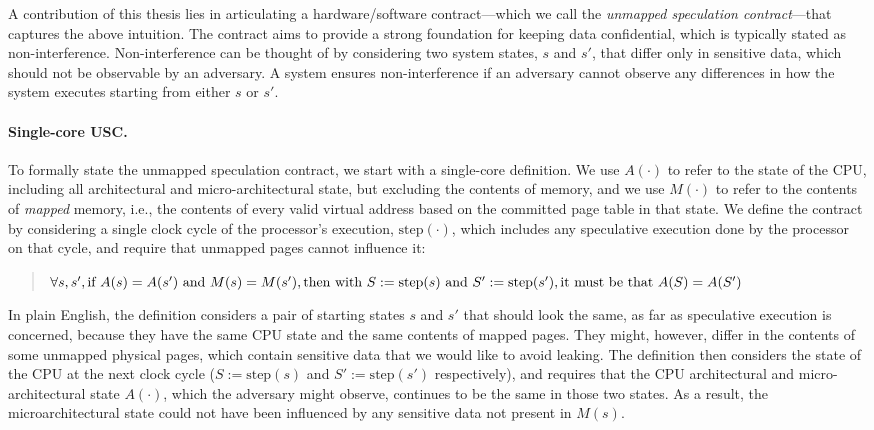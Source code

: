 
A contribution of this thesis lies in articulating a hardware/software
contract---which we call the \emph{unmapped speculation contract}---that
captures the above intuition.  The contract aims to provide a strong
foundation for keeping data confidential, which is typically stated as
non-interference.  Non-interference can be thought of by considering
two system states, $s$ and $s'$, that differ only in sensitive data,
which should not be observable by an adversary.  A system ensures
non-interference if an adversary cannot observe any differences in how
the system executes starting from either $s$ or $s'$.

\paragraph{Single-core USC.} To formally state the unmapped speculation contract, we start with a
single-core definition.  We use $A(\cdot)$ to refer to the state of
the CPU, including all architectural and micro-architectural state,
but excluding the contents of memory, and we use $M(\cdot)$ to refer
to the contents of \emph{mapped} memory, i.e., the contents of every
valid virtual address based on the committed page table in that state.
We define the contract by considering a single clock cycle of the
processor's execution, $\textrm{step}(\cdot)$, which includes any
speculative execution done by the processor on that cycle, and require
that unmapped pages cannot influence it:

\begin{small}
\begin{quote}
$\forall s, s', \\
  \textrm{if~} A(s) = A(s')
  \textrm{~and~} M(s) = M(s'), \\
  \textrm{then~with~} S := \textrm{step}(s)
  \textrm{~and~} S' := \textrm{step}(s'), \\
  \textrm{it~must~be~that~} A(S) = A(S')$
\end{quote}
\end{small}

In plain English, the definition considers a pair of starting states $s$
and $s'$ that should look the same, as far as speculative execution is
concerned, because they have the same CPU state and the same contents
of mapped pages.  They might, however, differ in the contents of some
unmapped physical pages, which contain sensitive data that we would
like to avoid leaking.  The definition then considers the state of
the CPU at the next clock cycle ($S := \textrm{step}(s)$ and $S' :=
\textrm{step}(s')$ respectively), and requires that the CPU architectural
and micro-architectural state $A(\cdot)$, which the adversary might
observe, continues to be the same in those two states.  As a result,
the microarchitectural state could not have been influenced by any
sensitive data not present in $M(s)$.

